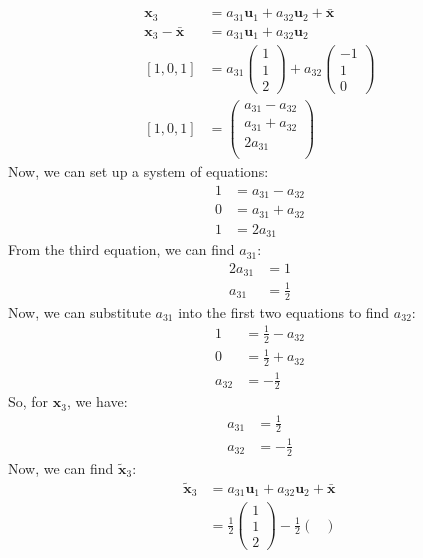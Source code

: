 \documentclass[a3paper,12pt]{extarticle} %
\begin{document}
\begin{enumerate}
\begin{align}
\mathbf{x}_3 &= a_{31}\mathbf{u}_1 + a_{32}\mathbf{u}_2 + \bar{\mathbf{x}}\\
\mathbf{x}_3 - \bar{\mathbf{x}} &= a_{31}\mathbf{u}_1 + a_{32}\mathbf{u}_2\\
[1, 0, 1] &= a_{31}\begin{pmatrix}
1\\
1\\
2
\end{pmatrix} + a_{32}\begin{pmatrix}
-1\\
1\\
0
\end{pmatrix}\\
[1, 0, 1] &= \begin{pmatrix}
a_{31} - a_{32}\\
a_{31} + a_{32}\\
2a_{31}\\
\end{pmatrix}
\end{align}
Now, we can set up a system of equations:
\begin{align}
1 &= a_{31} - a_{32}\\
0 &= a_{31} + a_{32}\\
1 &= 2a_{31}
\end{align}
From the third equation, we can find $a_{31}$:
\begin{align}
2a_{31} &= 1\\
a_{31} &= \frac{1}{2}
\end{align}
Now, we can substitute $a_{31}$ into the first two equations to find $a_{32}$:
\begin{align}
1 &= \frac{1}{2} - a_{32}\\
0 &= \frac{1}{2} + a_{32}\\
a_{32} &= -\frac{1}{2}
\end{align}
So, for $\mathbf{x}_3$, we have:
\begin{align}
a_{31} &= \frac{1}{2}\\
a_{32} &= -\frac{1}{2}
\end{align}
Now, we can find $\tilde{\mathbf{x}}_3$:
\begin{align}
\tilde{\mathbf{x}}_3 &= a_{31}\mathbf{u}_1 + a_{32}\mathbf{u}_2 + \bar{\mathbf{x}}\\
&= \frac{1}{2}\begin{pmatrix}
1\\
1\\
2
\end{pmatrix} - \frac{1}{2}\begin{pmatrix}

\end{pmatrix}
\end{align}
\end{enumerate}
\end{document}
